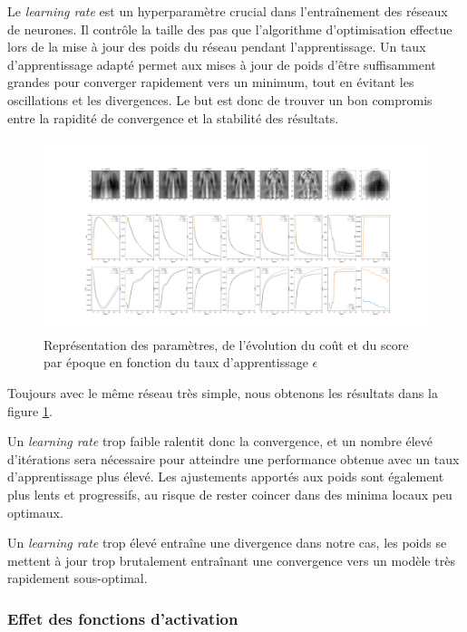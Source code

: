 \documentclass{article}
\begin{document}
Le \textit{learning rate} est un hyperparamètre crucial dans l'entraînement des réseaux de neurones. Il contrôle la taille des pas que l'algorithme d'optimisation effectue lors de la mise à jour des poids du réseau pendant l'apprentissage. Un taux d'apprentissage adapté permet aux mises à jour de poids d'être suffisamment grandes pour converger rapidement vers un minimum, tout en évitant les oscillations et les divergences. Le but est donc de trouver un bon compromis entre la rapidité de convergence et la stabilité des résultats.

\begin{figure}[htbp]
    \centering
    \includegraphics[width=\textwidth]{lr_effet.pdf}
    \caption{Représentation des paramètres, de l'évolution du coût et du score par époque en fonction du taux d'apprentissage $ \epsilon $ }
    \label{fig:effetlearningrate}
\end{figure}

Toujours avec le même réseau très simple, nous obtenons les résultats dans la figure \ref{fig:effetlearningrate}. 

Un \textit{learning rate} trop faible ralentit donc la convergence, et un nombre élevé d'itérations sera nécessaire pour atteindre une performance obtenue avec un taux d'apprentissage plus élevé. Les ajustements apportés aux poids sont également plus lents et progressifs, au risque de rester coincer dans des minima locaux peu optimaux.

Un \textit{learning rate} trop élevé entraîne une divergence dans notre cas, les poids se mettent à jour trop brutalement entraînant une convergence vers un modèle très rapidement sous-optimal.

\subsubsection{Effet des fonctions d'activation}
\end{document}
